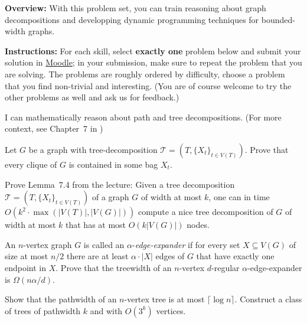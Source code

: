 \documentclass[english]{uebung_cs}
\begin{document}
\textbf{Overview:} With this problem set, you can train reasoning about graph decompositions and developping dynamic programming techniques for bounded-width graphs.

\textbf{Instructions:} For each skill, select \textbf{exactly one} problem below and submit your solution in \href{https://moodle.studiumdigitale.uni-frankfurt.de/moodle/course/view.php?id=6259}{Moodle}; in your submission, make sure to repeat the problem that you are solving.
The problems are roughly ordered by difficulty, choose a problem that you find non-trivial and interesting. (You are of course welcome to try the other problems as well and ask us for feedback.)

\begin{skill}
  I can mathematically reason about path and tree decompositions. \normalfont (For more context, see Chapter~7 in \cygan{})
\end{skill}

\begin{exercise}
  Let $G$ be a graph with tree-decomposition $\mathcal{T}=(T,\{X_t\}_{t\in V(T)})$. Prove that every clique of $G$ is contained in some bag $X_t$.
\end{exercise}

\begin{exercise}
  Prove Lemma~7.4 from the lecture:
  {Given a tree decomposition $\mathcal{T}=(T,\{X_t\}_{t\in V(T)})$ of a graph $G$ of width at most $k$, one can in time $O(k^2\cdot \max(|V(T)|,|V(G)|))$ compute a nice tree decomposition of $G$ of width at most $k$ that has at most $O(k|V(G)|)$ nodes.
  }
\end{exercise}

\begin{exercise}
  An $n$-vertex graph $G$ is called an $\alpha$-\emph{edge-expander} if for every set $X \subseteq V(G)$ of size at most $n/2$ there are at least $\alpha\cdot |X|$ edges of $G$ that have exactly one endpoint in $X$. Prove that the treewidth of an $n$-vertex $d$-regular $\alpha$-edge-expander is $\Omega(n\alpha/d)$.
\end{exercise}

\begin{exercise}[Pathwidth][\hard]
  Show that the pathwidth of an $n$-vertex tree is at most $\lceil \log n \rceil$. Construct a class of trees of pathwidth $k$ and with $O(3^k)$ vertices.
\end{exercise}
\end{document}
